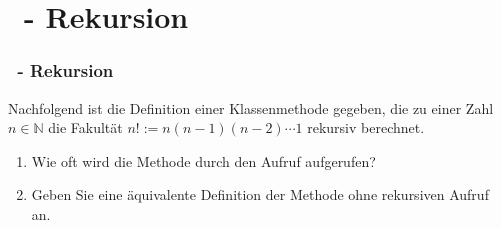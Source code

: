 \def\stitle{\theexercise\ - Rekursion}
\section{\stitle}
\begin{frame}%
  \frametitle{\stitle}%

Nachfolgend ist die Definition einer Klassenmethode gegeben, die zu einer Zahl $n \in \mathbb{N}$ die Fakult\"at $n! := n (n-1) (n-2)  \dotsm 1$ rekursiv berechnet.
\medskip



\begin{enumerate}
\item Wie oft wird die Methode durch den Aufruf  aufgerufen?

\item Geben Sie eine \"aquivalente Definition der Methode ohne rekursiven Aufruf an.
\end{enumerate}
\end{frame}

